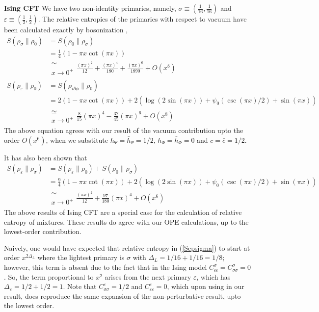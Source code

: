 \documentclass[11pt]{article}
\newcommand{\ep}{\epsilon}
\newcommand{\p}{\partial}
\newcommand{\lb}{\left(}
\newcommand{\rb}{\right)}
\begin{document}
  \textbf{Ising CFT} We have two non-identity primaries, namely, $\sigma \equiv
 \lb \frac{1}{16}, \frac{1}{16}\rb$ and $\varepsilon\equiv \lb \frac{1}{2},\frac{1}{2}\rb$. The relative entropies of the primaries with respect to vacuum have been calculated exactly by bosonization \cite{Nakagawa_2017},
 \begin{align}
     S(\rho_\sigma\| \rho_0) &= S(\rho_0\| \rho_\sigma)  \\
     &=\frac{1}{4}(1-\pi x \cot(\pi x)) \\
     &\substack{\simeq \\x\to 0^+} \frac{(\pi x)^2}{12} + \frac{(\pi x)^4}{180} + \frac{(\pi x)^6}{1890} + O(x^8) \\
     S(\rho_\varepsilon \| \rho_0) &= S(\rho_{i \p \phi}\| \rho_0) \\
     &= 2(1-\pi x \cot(\pi x))+2\lb \log(2\sin(\pi x))+\psi_0(\csc(\pi x)/2)+\sin(\pi x)\rb\\
      &\substack{\simeq \\x\to 0^+} \frac{8}{15}(\pi x)^4  -\frac{32}{45}\lb \pi x \rb^6  + O(x^8)
 \end{align}
 The above equation agrees with our result of the vacuum contribution upto the order $O(x^6)$, when we substitute $h_\Psi = \bar h_\Psi = 1/2$, $h_\Phi = \bar h_\Phi =0$ and $c=\bar c = 1/2$. 
 
 It has also been shown that
 \begin{align}\label{Sepsigma}
     S(
     \rho_\varepsilon \| \rho_\sigma) &= S(\rho_\varepsilon \| \rho_0) + S(\rho_0 \| \rho_\sigma)  \\
     &= \frac{9}{4}(1-\pi x\cot(\pi x) )+2\lb \log(2\sin(\pi x))+\psi_0(\csc(\pi x)/2)+\sin(\pi x)\rb
     \\&\substack{\simeq \\x\to 0^+} \frac{(\pi x)^2}{12} +  \frac{97}{180}(\pi x)^4 + O(x^6)
 \end{align}
 The above results of Ising CFT are a special case for the calculation of relative entropy of mixtures. These results do agree with our OPE calculations, up to the lowest-order contribution. 

Naively, one would have expected that relative entropy in (\ref{Sepsigma}) to start at order $x^{2\Delta_L}$ where the lightest primary is $\sigma$ with $\Delta_L=1/16+1/16=1/8$; however, this term is absent due to the fact that in the Ising model $C_{\ep\ep}^\sigma=C_{\sigma\sigma}^\sigma=0$. So, the term proportional to $x^2$ arises from the next primary $\varepsilon$, which has $\Delta_\varepsilon = 1/2 + 1/2 = 1$. Note that $C_{\sigma\sigma}^\varepsilon = 1/2$ and $C_{\varepsilon\varepsilon}^\varepsilon = 0$, which upon using in our result, does reproduce the same expansion of the non-perturbative result, upto the lowest order. 
\end{document}
